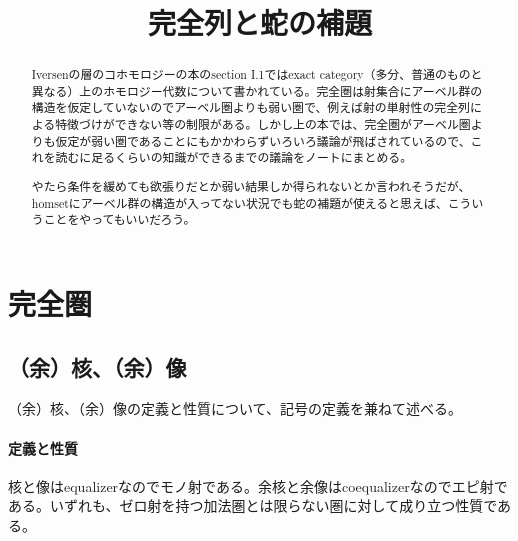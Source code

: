 \documentclass[a4paper,11pt]{jsarticle}
\theoremstyle{definition}
\begin{document}
\date{}
\title{完全列と蛇の補題}

\maketitle

\begin{abstract}
  Iversenの層のコホモロジーの本\cite{iversen2012cohomology}のsection I.1ではexact category（多分、普通のものと異なる）上のホモロジー代数について書かれている。完全圏は射集合にアーベル群の構造を仮定していないのでアーベル圏よりも弱い圏で、例えば射の単射性の完全列による特徴づけができない等の制限がある。しかし上の本では、完全圏がアーベル圏よりも仮定が弱い圏であることにもかかわらずいろいろ議論が飛ばされているので、これを読むに足るくらいの知識ができるまでの議論をノートにまとめる。

  やたら条件を緩めても欲張りだとか弱い結果しか得られないとか言われそうだが、homsetにアーベル群の構造が入ってない状況でも蛇の補題が使えると思えば、こういうことをやってもいいだろう。
\end{abstract}

\tableofcontents

\section{完全圏}
\subsection{（余）核、（余）像}

（余）核、（余）像の定義と性質について、記号の定義を兼ねて述べる。
\paragraph{定義と性質}

核と像はequalizerなのでモノ射である。余核と余像はcoequalizerなのでエピ射である。いずれも、ゼロ射を持つ加法圏とは限らない圏に対して成り立つ性質である。
\end{document}
